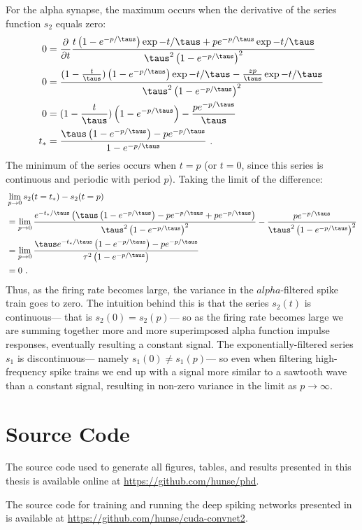 \begin{appendices}
For the alpha synapse, the maximum occurs when
the derivative of the series function $s_2$ equals zero:
\newcommand{\tstar}{t_*}
\begin{align}
  0 &= \pdiff{}{t} \frac{t\zpb\zt + p\zp\zt}{\taus^2\zpb^2} \\
  0 &= \frac{(1 - \frac{t}{\taus})\zpb\zt - \frac{zp}{\taus}\zt}{\taus^2\zpb^2} \\
  0 &= (1 - \frac{t}{\taus})\zpb - \frac{p\zp}{\taus} \\
  \tstar &= \frac{\taus\zpb - p\zp}{\zpa} \text{ .}
\end{align}
The minimum of the series occurs when $t = p$
(or $t = 0$, since this series is continuous and periodic with period $p$).
Taking the limit of the difference:
\begin{align}
  & \lim_{p \to 0} s_2(t=\tstar) - s_2(t=p) \\
  &= \lim_{p \to 0}
   \frac{e^{-\tstar/\taus}\left(\taus\zpb - p\zp + p\zp\right)}{\taus^2\zpb^2}
   - \frac{p\zp}{\taus^2\zpb^2} \\
  &= \lim_{p \to 0} \frac{\taus e^{-\tstar/\taus}\zpb - p\zp}{\tau^2\zpb} \\
  &= 0 \text{ .}
\end{align}
Thus, as the firing rate becomes large,
the variance in the $alpha$-filtered spike train goes to zero.
The intuition behind this is that the series $s_2(t)$ is continuous---%
that is $s_2(0) = s_2(p)$---%
so as the firing rate becomes large we are summing together more and more
superimposed alpha function impulse responses,
eventually resulting a constant signal.
The exponentially-filtered series $s_1$ is discontinuous---
namely $s_1(0) \ne s_1(p)$---%
so even when filtering high-frequency spike trains
we end up with a signal more similar to a sawtooth wave than a constant signal,
resulting in non-zero variance in the limit as $p \to \infty$.


\chapter{Source Code}

The source code used to generate all figures, tables, and results
presented in this thesis is available online at
\url{https://github.com/hunse/phd}.

The source code for training and running the deep spiking networks
presented in  is available at
\url{https://github.com/hunse/cuda-convnet2}.


\end{appendices}

